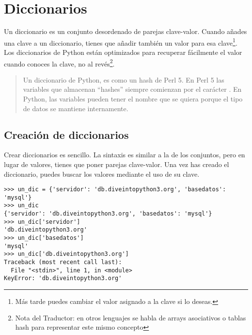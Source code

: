 \section{Diccionarios}

Un diccionario es un conjunto desordenado de parejas clave-valor. Cuando añades una clave a un diccionario, tienes que añadir también un valor para esa clave\footnote{Más tarde puedes cambiar el valor asignado a la clave si lo deseas.}. Los diccionarios de Python están optimizados para recuperar fácilmente el valor cuando conoces la clave, no al revés\footnote{Nota del Traductor: en otros lenguajes se habla de arrays asociativos o tablas hash para representar este mismo concepto}.

\begin{quote}
Un diccionario de Python, es como un hash de Perl 5. En Perl 5 las variables que almacenan ``hashes'' siempre comienzan por el carácter \codigo{\%}. En Python, las variables pueden tener el nombre que se quiera porque el tipo de datos se mantiene internamente.

\end{quote}

\subsection{Creación de diccionarios}

Crear diccionarios es sencillo. La sintaxis es similar a la de los conjuntos, pero en lugar de valores, tienes que poner parejas clave-valor. Una vez has creado el diccionario, puedes buscar los valores mediante el uso de su clave.

\noindent\begin{minipage}{\textwidth}
\begin{lstlisting}[mathescape=True]
>>> un_dic = {'servidor': 'db.diveintopython3.org', 'basedatos': 'mysql'}
>>> un_dic
{'servidor': 'db.diveintopython3.org', 'basedatos': 'mysql'}
>>> un_dic['servidor']
'db.diveintopython3.org'
>>> un_dic['basedatos']
'mysql'
>>> un_dic['db.diveintopython3.org']
Traceback (most recent call last):
  File "<stdin>", line 1, in <module>
KeyError: 'db.diveintopython3.org'
\end{lstlisting}
\end{minipage}

